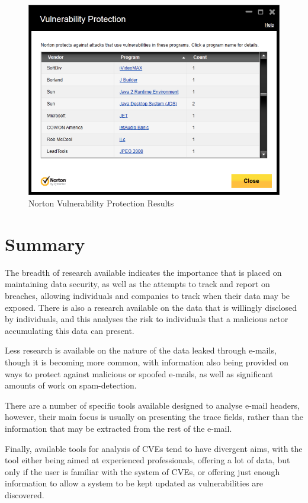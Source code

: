 \begin{figure}[h!t]  \centering \includegraphics[width=0.9\linewidth]{norton-cve}

	 \caption{Norton Vulnerability Protection Results}\label{fig:nort}
\end{figure}

\section{Summary}

The breadth of research available indicates the importance that is placed on
maintaining data security, as well as the attempts to track and report on
breaches, allowing individuals and companies to track when their data may be
exposed.  There is also a research available on the data that is willingly
disclosed by individuals, and this analyses the risk to individuals that a
malicious actor accumulating this data can present. 

Less research is available on the nature of the data leaked through e-mails,
though it is becoming more common, with information also being provided on ways
to protect against malicious or spoofed e-mails, as well as significant amounts
of work on spam-detection.

There are a number of specific tools available designed to analyse e-mail
headers, however, their main focus is usually on presenting the trace fields,
rather than the information that may be extracted from the rest of the e-mail.

Finally, available tools for analysis of CVEs tend to have divergent aims, with
the tool either being aimed at experienced professionals, offering a lot of
data, but only if the user is familiar with the system of CVEs, or offering
just enough information to allow a system to be kept updated as vulnerabilities
are discovered.
